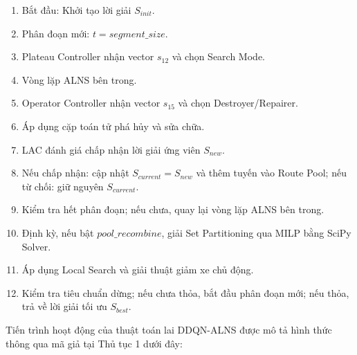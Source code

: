 \documentclass[13pt,a4paper]{extarticle}
\begin{document}
\begin{enumerate}[leftmargin=1.2cm]
  \item Bắt đầu: Khởi tạo lời giải $S_{init}$.
  \item Phân đoạn mới: $t = segment\_size$.
  \item Plateau Controller nhận vector $s_{12}$ và chọn Search Mode.
  \item Vòng lặp ALNS bên trong.
  \item Operator Controller nhận vector $s_{15}$ và chọn Destroyer/Repairer.
  \item Áp dụng cặp toán tử phá hủy và sửa chữa.
  \item LAC đánh giá chấp nhận lời giải ứng viên $S_{new}$.
  \item Nếu chấp nhận: cập nhật $S_{current}=S_{new}$ và thêm tuyến vào Route Pool; nếu từ chối: giữ nguyên $S_{current}$.
  \item Kiểm tra hết phân đoạn; nếu chưa, quay lại vòng lặp ALNS bên trong.
  \item Định kỳ, nếu bật $pool\_recombine$, giải Set Partitioning qua MILP bằng SciPy Solver.
  \item Áp dụng Local Search và giải thuật giảm xe chủ động.
  \item Kiểm tra tiêu chuẩn dừng; nếu chưa thỏa, bắt đầu phân đoạn mới; nếu thỏa, trả về lời giải tối ưu $S_{best}$.
\end{enumerate}
\normalsize

Tiến trình hoạt động của thuật toán lai DDQN-ALNS được mô tả hình thức thông qua mã giả tại Thủ tục 1 dưới đây:
\end{document}

